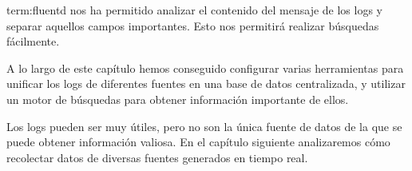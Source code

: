 \gls{term:fluentd} nos ha permitido analizar el contenido del mensaje de los
logs y separar aquellos campos importantes. Esto nos permitirá realizar
búsquedas fácilmente.

A lo largo de este capítulo hemos conseguido configurar varias herramientas
para unificar los logs de diferentes fuentes en una base de datos centralizada,
y utilizar un motor de búsquedas para obtener información importante de ellos.

Los logs pueden ser muy útiles, pero no son la única fuente de datos de la que
se puede obtener información valiosa. En el capítulo siguiente analizaremos
cómo recolectar datos de diversas fuentes generados en tiempo real.

